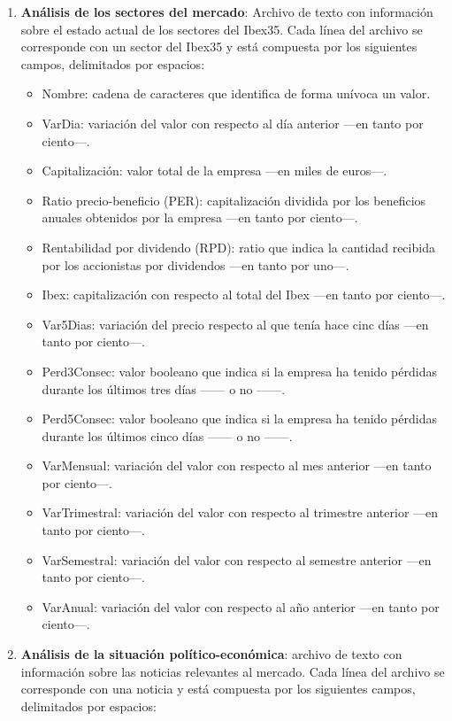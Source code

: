 \documentclass[a4paper, 11pt, titlepage]{article}
\begin{document}
\begin{enumerate}
        \item \textbf{Análisis de los sectores del mercado}: Archivo de texto con información sobre el estado actual de los sectores del Ibex35. Cada línea del archivo se corresponde con un sector del Ibex35 y está compuesta por los siguientes campos, delimitados por espacios:
        \begin{itemize}
            \item Nombre: cadena de caracteres que identifica de forma unívoca un valor.
            \item VarDia: variación del valor con respecto al día anterior ---en tanto por ciento---.
            \item Capitalización: valor total de la empresa ---en miles de euros---.
            \item Ratio precio-beneficio (PER): capitalización dividida por los beneficios anuales obtenidos por la empresa ---en tanto por ciento---.
            \item Rentabilidad por dividendo (RPD): ratio que indica la cantidad recibida por los accionistas por dividendos ---en tanto por uno---.
            \item Ibex: capitalización con respecto al total del Ibex ---en tanto por ciento---.
            \item Var5Dias: variación del precio respecto al que tenía hace cinc días ---en tanto por ciento---.
            \item Perd3Consec: valor booleano que indica si la empresa ha tenido pérdidas durante los últimos tres días ------ o no ------.
            \item Perd5Consec: valor booleano que indica si la empresa ha tenido pérdidas durante los últimos cinco días ------ o no ------.
            \item VarMensual: variación del valor con respecto al mes anterior ---en tanto por ciento---.
            \item VarTrimestral: variación del valor con respecto al trimestre anterior ---en tanto por ciento---.
            \item VarSemestral: variación del valor con respecto al semestre anterior ---en tanto por ciento---.
            \item VarAnual: variación del valor con respecto al año anterior ---en tanto por ciento---.
        \end{itemize}
        \item \textbf{Análisis de la situación político-económica}: archivo de texto con información sobre las noticias relevantes al mercado. Cada línea del archivo se corresponde con una noticia y está compuesta por los siguientes campos, delimitados por espacios:

\end{enumerate}
\end{document}
